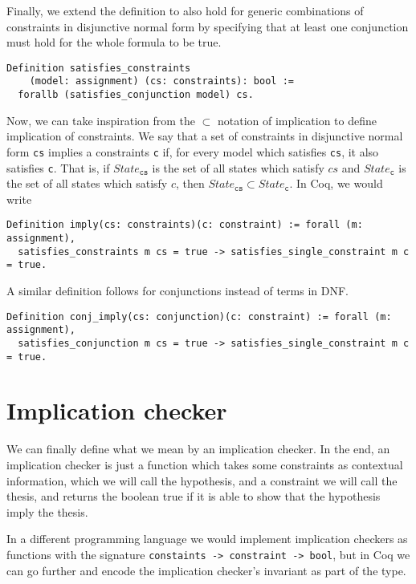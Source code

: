 Finally, we extend the definition to also hold for generic combinations of constraints in disjunctive 
normal form by specifying that at least one conjunction must hold for the whole formula to be true.

\begin{verbatim}
Definition satisfies_constraints 
    (model: assignment) (cs: constraints): bool :=
  forallb (satisfies_conjunction model) cs.
\end{verbatim}

Now, we can take inspiration from the $\subset$ notation of implication to define implication of 
constraints. We say that a set of constraints in disjunctive normal form \texttt{cs} implies a constraints \texttt{c} if,
for every model which satisfies \texttt{cs}, it also satisfies \texttt{c}. That is, if $State_{\texttt{cs}}$ is the set of
all states which satisfy $cs$ and $State_{\texttt{c}}$ is the set of all states which satisfy $c$, then
$State_{\texttt{cs}} \subset State_{\texttt{c}}$. In Coq, we would write

\begin{verbatim}
Definition imply(cs: constraints)(c: constraint) := forall (m: assignment),
  satisfies_constraints m cs = true -> satisfies_single_constraint m c = true.
\end{verbatim}

A similar definition follows for conjunctions instead of terms in DNF.
\begin{verbatim}
Definition conj_imply(cs: conjunction)(c: constraint) := forall (m: assignment),
  satisfies_conjunction m cs = true -> satisfies_single_constraint m c = true.
\end{verbatim}

\section{Implication checker}

We can finally define what we mean by an implication checker. In the end, an implication checker is 
just a function which takes some constraints as contextual information, which we will call the 
hypothesis, and a constraint we will call the thesis, and returns the boolean true if it is able to 
show that the hypothesis imply the thesis.

In a different programming language we would implement implication checkers as functions with the 
signature \texttt{constaints -> constraint -> bool}, but in Coq we can go further and encode 
the implication checker's invariant as part of the type.

